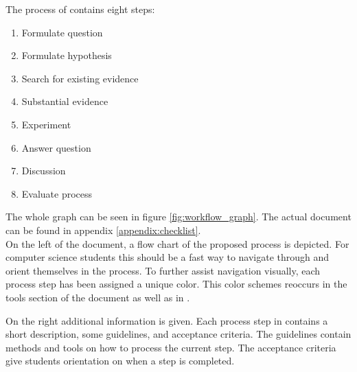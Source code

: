 \begin{minipage}{\linewidth}
The process of \checklist contains eight steps:
\begin{enumerate}
\item Formulate question
\item Formulate hypothesis
\item Search for existing evidence
\item Substantial evidence
\item Experiment
\item Answer question
\item Discussion
\item Evaluate process
\end{enumerate}


The whole graph can be seen in figure \ref{fig:workflow_graph}. The actual document can be found in appendix \ref{appendix:checklist}.\\
On the left of the document, a flow chart of the proposed process is depicted. For computer science students this should be a fast way to navigate through and orient themselves in the process. To further assist navigation visually, each process step has been assigned a unique color. This color schemes reoccurs in the tools section of the document as well as in \briefingform.

On the right additional information is given. Each process step in \checklist contains a short description, some guidelines, and acceptance criteria. The guidelines contain methods and tools on how to process the current step. The acceptance criteria give students orientation on when a step is completed.
\end{minipage}










